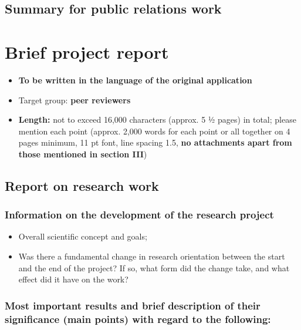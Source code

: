 \documentclass[a4paper, 11pt]{article}
\begin{document}
\subsection{Summary for public relations work}

\newpage
\section{Brief project report}
\setcounter{subsection}{0}

\begin{itemize}
\item \textbf{To be written in the language of the original application}
\item Target group:  \textbf{peer reviewers}
\item \textbf{Length:}  not to exceed 16,000 characters (approx. 5 ½ pages) in total; please
mention each point (approx. 2,000 words for each point or all together on 4
pages minimum, 11 pt font, line spacing 1.5, \textbf{no attachments apart from those
mentioned in section III})
\end{itemize}

\subsection{Report on research work}

\subsubsection{Information on the development of the research project}

\begin{itemize}
\item Overall scientific concept and goals;
\item Was there a fundamental change in research orientation between the start and the
end of the project? If so, what form did the change take, and what effect did it
have on the work?
\end{itemize}

\subsubsection{Most important results and brief description of their significance (main
points) with regard to the following:}
\end{document}
